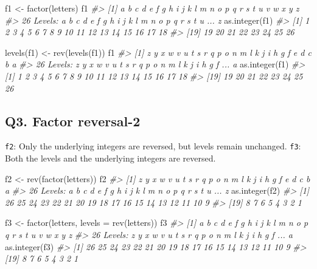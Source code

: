 \documentclass[
]{book}
\newenvironment{Shaded}{\begin{snugshade}}{\end{snugshade}}
\newcommand{\AttributeTok}[1]{\textcolor[rgb]{0.77,0.63,0.00}{#1}}
\newcommand{\CommentTok}[1]{\textcolor[rgb]{0.56,0.35,0.01}{\textit{#1}}}
\newcommand{\FunctionTok}[1]{\textcolor[rgb]{0.00,0.00,0.00}{#1}}
\newcommand{\NormalTok}[1]{#1}
\newcommand{\OtherTok}[1]{\textcolor[rgb]{0.56,0.35,0.01}{#1}}
\begin{document}
\begin{Shaded}
\begin{Highlighting}[]
\NormalTok{f1 }\OtherTok{\textless{}{-}} \FunctionTok{factor}\NormalTok{(letters)}
\NormalTok{f1}
\CommentTok{\#\textgreater{}  [1] a b c d e f g h i j k l m n o p q r s t u v w x y z}
\CommentTok{\#\textgreater{} 26 Levels: a b c d e f g h i j k l m n o p q r s t u ... z}
\FunctionTok{as.integer}\NormalTok{(f1)}
\CommentTok{\#\textgreater{}  [1]  1  2  3  4  5  6  7  8  9 10 11 12 13 14 15 16 17 18}
\CommentTok{\#\textgreater{} [19] 19 20 21 22 23 24 25 26}

\FunctionTok{levels}\NormalTok{(f1) }\OtherTok{\textless{}{-}} \FunctionTok{rev}\NormalTok{(}\FunctionTok{levels}\NormalTok{(f1))}
\NormalTok{f1}
\CommentTok{\#\textgreater{}  [1] z y x w v u t s r q p o n m l k j i h g f e d c b a}
\CommentTok{\#\textgreater{} 26 Levels: z y x w v u t s r q p o n m l k j i h g f ... a}
\FunctionTok{as.integer}\NormalTok{(f1)}
\CommentTok{\#\textgreater{}  [1]  1  2  3  4  5  6  7  8  9 10 11 12 13 14 15 16 17 18}
\CommentTok{\#\textgreater{} [19] 19 20 21 22 23 24 25 26}
\end{Highlighting}
\end{Shaded}

\hypertarget{q3.-factor-reversal-2}{%
\subsection*{Q3. Factor reversal-2}\label{q3.-factor-reversal-2}}

\texttt{f2}: Only the underlying integers are reversed, but levels remain unchanged.
\texttt{f3}: Both the levels and the underlying integers are reversed.

\begin{Shaded}
\begin{Highlighting}[]
\NormalTok{f2 }\OtherTok{\textless{}{-}} \FunctionTok{rev}\NormalTok{(}\FunctionTok{factor}\NormalTok{(letters))}
\NormalTok{f2}
\CommentTok{\#\textgreater{}  [1] z y x w v u t s r q p o n m l k j i h g f e d c b a}
\CommentTok{\#\textgreater{} 26 Levels: a b c d e f g h i j k l m n o p q r s t u ... z}
\FunctionTok{as.integer}\NormalTok{(f2)}
\CommentTok{\#\textgreater{}  [1] 26 25 24 23 22 21 20 19 18 17 16 15 14 13 12 11 10  9}
\CommentTok{\#\textgreater{} [19]  8  7  6  5  4  3  2  1}

\NormalTok{f3 }\OtherTok{\textless{}{-}} \FunctionTok{factor}\NormalTok{(letters, }\AttributeTok{levels =} \FunctionTok{rev}\NormalTok{(letters))}
\NormalTok{f3}
\CommentTok{\#\textgreater{}  [1] a b c d e f g h i j k l m n o p q r s t u v w x y z}
\CommentTok{\#\textgreater{} 26 Levels: z y x w v u t s r q p o n m l k j i h g f ... a}
\FunctionTok{as.integer}\NormalTok{(f3)}
\CommentTok{\#\textgreater{}  [1] 26 25 24 23 22 21 20 19 18 17 16 15 14 13 12 11 10  9}
\CommentTok{\#\textgreater{} [19]  8  7  6  5  4  3  2  1}
\end{Highlighting}
\end{Shaded}
\end{document}

